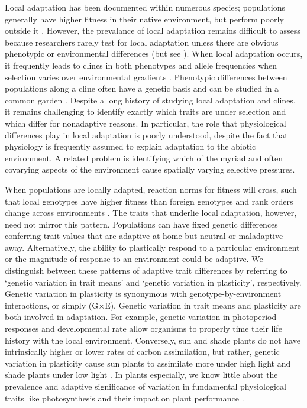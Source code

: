 \documentclass[11pt, oneside]{article}
\begin{document}

Local adaptation has been documented within numerous species; populations generally have higher fitness in their native environment, but perform poorly outside it \citep{Schluter_2000, Leimu_Fischer_2008, Hereford_2009}. However, the prevalance of local adaptation remains difficult to assess because researchers rarely test for local adaptation unless there are obvious phenotypic or environmental differences (but see \citeauthor{Hereford_Winn_2008} \citeyear{Hereford_Winn_2008}). When local adaptation occurs, it frequently leads to clines in both phenotypes and allele frequencies when selection varies over environmental gradients \citep{Huxley_1938, Endler_1977, Barton_1999}. Phenotypic differences between populations along a cline often have a genetic basis and can be studied in a common garden \citep{Turesson_1922, Clausen_etal_1940, Hiesey_etal_1942}. Despite a long history of studying local adaptation and clines, it remains challenging to identify exactly which traits are under selection and which differ for nonadaptive reasons. In particular, the role that physiological differences play in local adaptation is poorly understood, despite the fact that physiology is frequently assumed to explain adaptation to the abiotic environment. A related problem is identifying which of the myriad and often covarying aspects of the environment cause spatially varying selective pressures. 

When populations are locally adapted, reaction norms for fitness will cross, such that local genotypes have higher fitness than foreign genotypes and rank orders change across environments \citep{Kawecki_Ebert_2004}. The traits that underlie local adaptation, however, need not mirror this pattern. Populations can have fixed genetic differences conferring trait values that are adaptive at home but neutral or maladaptive away. Alternatively, the ability to plastically respond to a particular environment or the magnitude of response to an environment could be adaptive. We distinguish between these patterns of adaptive trait differences by referring to `genetic variation in trait means' and `genetic variation in plasticity', respectively. Genetic variation in plasticity is synonymous with genotype-by-environment interactions, or simply (G$\times$E). Genetic variation in trait means and plasticity are both involved in adaptation. For example, genetic variation in photoperiod responses \citep{Blackman_etal_2011} and developmental rate \citep{Stinchcombe_etal_2004} allow organisms to properly time their life history with the local environment. Conversely, sun and shade plants do not have intrinsically higher or lower rates of carbon assimilation, but rather, genetic variation in plasticity cause sun plants to assimilate more under high light and shade plants under low light \citep{Givnish_1988}. In plants especially, we know little about the prevalence and adaptive significance of variation in fundamental physiological traits like photosynthesis and their impact on plant performance \citep{Flood_etal_2011}.
\end{document}
